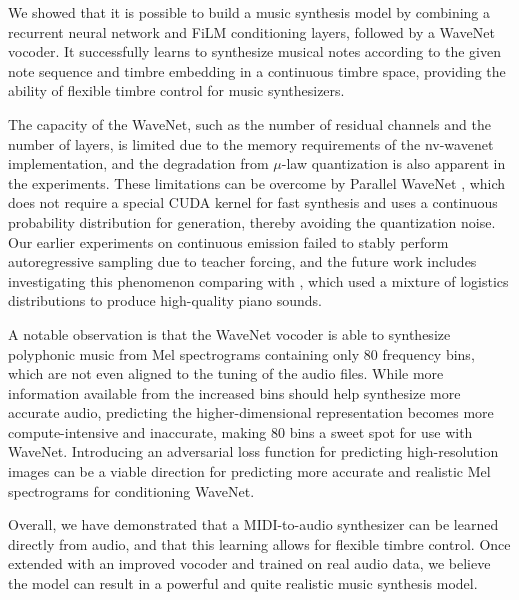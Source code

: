 We showed that it is possible to build a music synthesis model by combining a recurrent neural network and FiLM conditioning layers, followed by a WaveNet vocoder.
It successfully learns to synthesize musical notes according to the given note sequence and timbre embedding in a continuous timbre space, providing the ability of flexible timbre control for music synthesizers.

The capacity of the WaveNet, such as the number of residual channels and the number of layers, is limited due to the memory requirements of the nv-wavenet implementation, and the degradation from $\mu$-law quantization is also apparent in the experiments.
These limitations can be overcome by Parallel WaveNet \cite{oord2018parallel}, which does not require a special CUDA kernel for fast synthesis and uses a continuous probability distribution for generation, thereby avoiding the quantization noise.
Our earlier experiments on continuous emission failed to stably perform autoregressive sampling due to teacher forcing, and the future work includes investigating this phenomenon comparing with \cite{hawthorne2019maestro}, which used a mixture of logistics distributions to produce high-quality piano sounds.

A notable observation is that the WaveNet vocoder is able to synthesize polyphonic music from Mel spectrograms containing only 80 frequency bins, which are not even aligned to the tuning of the audio files.
While more information available from the increased bins should help synthesize more accurate audio, predicting the higher-dimensional representation becomes more compute-intensive and inaccurate, making 80 bins a sweet spot for use with WaveNet.
Introducing an adversarial loss function for predicting high-resolution images \cite{ledig2017superresolution} can be a viable direction for predicting more accurate and realistic Mel spectrograms for conditioning WaveNet.

Overall, we have demonstrated that a MIDI-to-audio synthesizer can be learned directly from audio, and that this learning allows for flexible timbre control.
Once extended with an improved vocoder and trained on real audio data, we believe the model can result in a powerful and quite realistic music synthesis model.
